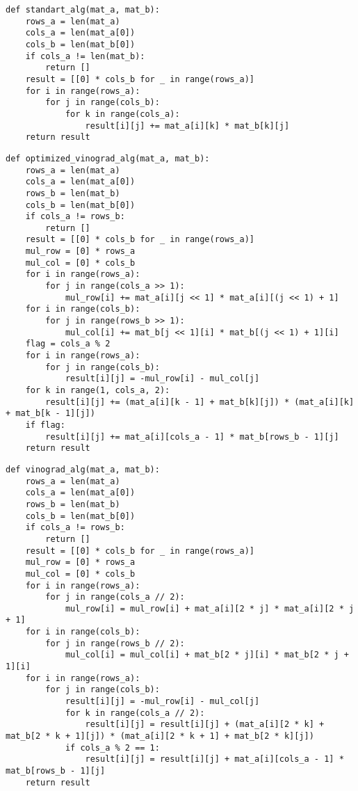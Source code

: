 \begin{center}
    \captionsetup{justification=raggedright,singlelinecheck=off}
    \begin{lstlisting}[label=lst:stand_alg,caption=Стандартный алгоритм умножения матриц]
def standart_alg(mat_a, mat_b):
	rows_a = len(mat_a)
	cols_a = len(mat_a[0])
	cols_b = len(mat_b[0])
	if cols_a != len(mat_b):
		return []
	result = [[0] * cols_b for _ in range(rows_a)]
	for i in range(rows_a):
		for j in range(cols_b):
			for k in range(cols_a):
				result[i][j] += mat_a[i][k] * mat_b[k][j]
	return result
	\end{lstlisting}
	\captionsetup{justification=raggedright,singlelinecheck=off}
	\begin{lstlisting}[label=lst:opt_vin_alg,caption=Оптимизированный алгоритм Винограда]
def optimized_vinograd_alg(mat_a, mat_b):
	rows_a = len(mat_a)
	cols_a = len(mat_a[0])
	rows_b = len(mat_b)
	cols_b = len(mat_b[0])
	if cols_a != rows_b:
		return []
	result = [[0] * cols_b for _ in range(rows_a)]
	mul_row = [0] * rows_a
	mul_col = [0] * cols_b
	for i in range(rows_a):
		for j in range(cols_a >> 1):
			mul_row[i] += mat_a[i][j << 1] * mat_a[i][(j << 1) + 1]
	for i in range(cols_b):
		for j in range(rows_b >> 1):
			mul_col[i] += mat_b[j << 1][i] * mat_b[(j << 1) + 1][i]
	flag = cols_a % 2
	for i in range(rows_a):
		for j in range(cols_b):
			result[i][j] = -mul_row[i] - mul_col[j]
	for k in range(1, cols_a, 2):
		result[i][j] += (mat_a[i][k - 1] + mat_b[k][j]) * (mat_a[i][k] + mat_b[k - 1][j])
	if flag:
		result[i][j] += mat_a[i][cols_a - 1] * mat_b[rows_b - 1][j]
	return result
	\end{lstlisting}
\end{center}


\begin{center}
    \captionsetup{justification=raggedright,singlelinecheck=off}
    \begin{lstlisting}[label=lst:vin_alg,caption=Алгоритм Винограда]
def vinograd_alg(mat_a, mat_b):
	rows_a = len(mat_a)
	cols_a = len(mat_a[0])
	rows_b = len(mat_b)
	cols_b = len(mat_b[0])
	if cols_a != rows_b:
		return []
	result = [[0] * cols_b for _ in range(rows_a)]
	mul_row = [0] * rows_a
	mul_col = [0] * cols_b
	for i in range(rows_a):
		for j in range(cols_a // 2):
			mul_row[i] = mul_row[i] + mat_a[i][2 * j] * mat_a[i][2 * j + 1]
	for i in range(cols_b):
		for j in range(rows_b // 2):
			mul_col[i] = mul_col[i] + mat_b[2 * j][i] * mat_b[2 * j + 1][i]
	for i in range(rows_a):
		for j in range(cols_b):
			result[i][j] = -mul_row[i] - mul_col[j]
			for k in range(cols_a // 2):
				result[i][j] = result[i][j] + (mat_a[i][2 * k] + mat_b[2 * k + 1][j]) * (mat_a[i][2 * k + 1] + mat_b[2 * k][j])
			if cols_a % 2 == 1:
				result[i][j] = result[i][j] + mat_a[i][cols_a - 1] * mat_b[rows_b - 1][j]
	return result
\end{lstlisting}
\end{center}


